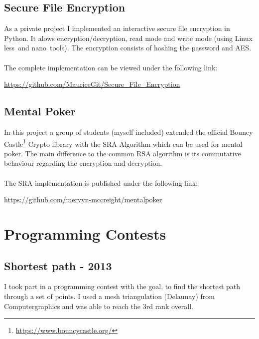 \documentclass[a4paper, 12pt]{article}
\begin{document}
\subsection{Secure File Encryption}

As a private project I implemented an interactive secure file encryption in Python. It alows encryption/decryption, read mode and write mode (using Linux \glq less\grq\  and \glq nano\grq\ tools). The encryption consists of hashing the password and AES.
\\
\\
The complete implementation can be viewed under the following link:

\begin{center}
	\url{https://github.com/MauriceGit/Secure_File_Encryption}
\end{center}


\subsection{Mental Poker}

In this project a group of students (myself included) extended the official Bouncy Castle\footnote{\url{https://www.bouncycastle.org/}} Crypto library with the SRA Algorithm which can be used
for mental poker. The main difference to the common RSA algorithm is its commutative behaviour regarding 
the encryption and decryption.
\\
\\
The SRA implementation is published under the following link:

\begin{center}
	\url{https://github.com/mervyn-mccreight/mentalpoker}
\end{center}

\newpage

\section{Programming Contests}

\subsection{Shortest path - 2013}

I took part in a programming contest with the goal, to find the shortest path through a set of points.
I used a mesh triangulation (Delaunay) from Computergraphics and was able to reach the 3rd rank
overall.
\end{document}
